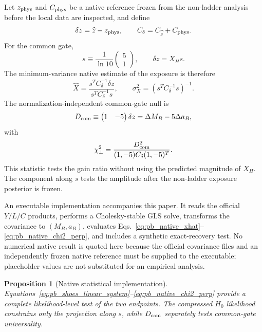 \documentclass[aps,prd,twocolumn,10pt,superscriptaddress,nofootinbib]{revtex4-2}
\newtheorem{proposition}{Proposition}
\begin{document}
Let $z_{\rm phys}$ and $C_{\rm phys}$ be a native reference frozen from the
non-ladder analysis before the local data are inspected, and define
\begin{equation}
 \delta z=\widehat z-z_{\rm phys},
 \qquad
 C_\delta=C_{\widehat z}+C_{\rm phys}.
 \label{eq:pb_native_delta}
\end{equation}
For the common gate,
\begin{equation}
 s\equiv\frac{1}{\ln10}
 \begin{pmatrix}5\\1\end{pmatrix},
 \qquad \delta z=X_Hs.
 \label{eq:pb_native_shift_vector}
\end{equation}
The minimum-variance native estimate of the exposure is therefore
\begin{equation}
 \widehat X
 =\frac{s^TC_\delta^{-1}\delta z}
 {s^TC_\delta^{-1}s},
 \qquad
 \sigma_X^2=(s^TC_\delta^{-1}s)^{-1}.
 \label{eq:pb_native_xhat}
\end{equation}
The normalization-independent common-gate null is
\begin{equation}
 D_{\rm com}\equiv
 \begin{pmatrix}1&-5\end{pmatrix}\delta z
 =\Delta M_B-5\Delta a_B,
 \label{eq:pb_native_D}
\end{equation}
with
\begin{equation}
 \chi^2_\perp
 =\frac{D_{\rm com}^2}
 {(1,-5)C_\delta(1,-5)^T}.
 \label{eq:pb_native_chi2_perp}
\end{equation}
This statistic tests the gain ratio without using the predicted magnitude of
$X_H$.  The component along $s$ tests the amplitude after the non-ladder
exposure posterior is frozen.

An executable implementation accompanies this paper.  It reads the official
$Y/L/C$ products, performs a Cholesky-stable GLS solve, transforms the
covariance to $(M_B,a_B)$, evaluates
Eqs.~\eqref{eq:pb_native_xhat}--\eqref{eq:pb_native_chi2_perp}, and includes
a synthetic exact-recovery test.  No numerical native result is quoted here
because the official covariance files and an independently frozen native
reference must be supplied to the executable; placeholder values are not
substituted for an empirical analysis.

\begin{proposition}[Native statistical implementation]
Equations~\eqref{eq:pb_shoes_linear_system}--\eqref{eq:pb_native_chi2_perp}
provide a complete likelihood-level test of the two endpoints.  The
compressed $H_0$ likelihood constrains only the projection along $s$, while
$D_{\rm com}$ separately tests common-gate universality.
\end{proposition}
\end{document}
